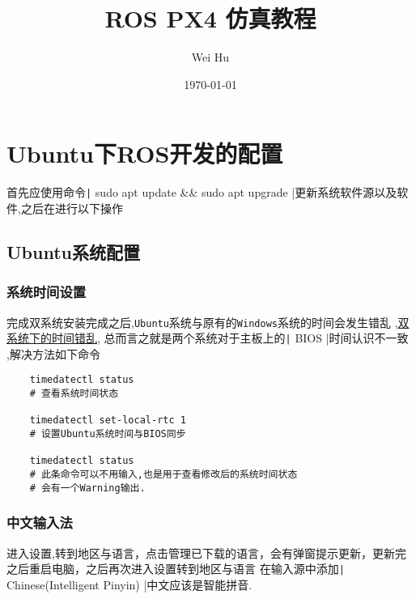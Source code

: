 \documentclass{article}
\newcommand\bash[1]{\texttt| #1 |}
\begin{document}
\author{Wei Hu}
\date{\today}
\title{\textbf{ROS PX4 仿真教程}}

\maketitle

\section{Ubuntu下ROS开发的配置}
首先应使用命令\bash{sudo apt update && sudo apt upgrade}更新系统软件源以及软件,之后在进行以下操作
\subsection{Ubuntu系统配置}
\subsubsection{系统时间设置}
完成双系统安装完成之后,\texttt{Ubuntu}系统与原有的\texttt{Windows}系统的时间会发生错乱
,\href{URLhttps://zhuanlan.zhihu.com/p/492885761}{双系统下的时间错乱},
总而言之就是两个系统对于主板上的\texttt| BIOS |时间认识不一致
,解决方法如下命令
\begin{verbatim}
    timedatectl status 
    # 查看系统时间状态

    timedatectl set-local-rtc 1 
    # 设置Ubuntu系统时间与BIOS同步
    
    timedatectl status 
    # 此条命令可以不用输入,也是用于查看修改后的系统时间状态
    # 会有一个Warning输出.
\end{verbatim}
\subsubsection{中文输入法}
进入设置,转到地区与语言，点击管理已下载的语言，会有弹窗提示更新，更新完之后重启电脑，之后再次进入设置转到地区与语言
在输入源中添加\bash{Chinese(Intelligent Pinyin)}中文应该是智能拼音.
\end{document}

